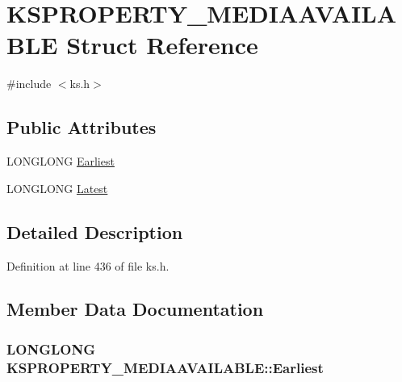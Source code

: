 \hypertarget{struct_k_s_p_r_o_p_e_r_t_y___m_e_d_i_a_a_v_a_i_l_a_b_l_e}{}\section{K\+S\+P\+R\+O\+P\+E\+R\+T\+Y\+\_\+\+M\+E\+D\+I\+A\+A\+V\+A\+I\+L\+A\+B\+LE Struct Reference}
\label{struct_k_s_p_r_o_p_e_r_t_y___m_e_d_i_a_a_v_a_i_l_a_b_l_e}


{\ttfamily \#include $<$ks.\+h$>$}

\subsection*{Public Attributes}
\begin{DoxyCompactItemize}
\item 
L\+O\+N\+G\+L\+O\+NG \hyperlink{struct_k_s_p_r_o_p_e_r_t_y___m_e_d_i_a_a_v_a_i_l_a_b_l_e_a0ff3eb2fb0a34ee47513d2aec844b30d}{Earliest}
\item 
L\+O\+N\+G\+L\+O\+NG \hyperlink{struct_k_s_p_r_o_p_e_r_t_y___m_e_d_i_a_a_v_a_i_l_a_b_l_e_a22df0452fc14201d10124a3eb59376d8}{Latest}
\end{DoxyCompactItemize}


\subsection{Detailed Description}


Definition at line 436 of file ks.\+h.



\subsection{Member Data Documentation}
\subsubsection[{\texorpdfstring{Earliest}{Earliest}}]{\setlength{\rightskip}{0pt plus 5cm}L\+O\+N\+G\+L\+O\+NG K\+S\+P\+R\+O\+P\+E\+R\+T\+Y\+\_\+\+M\+E\+D\+I\+A\+A\+V\+A\+I\+L\+A\+B\+L\+E\+::\+Earliest}\hypertarget{struct_k_s_p_r_o_p_e_r_t_y___m_e_d_i_a_a_v_a_i_l_a_b_l_e_a0ff3eb2fb0a34ee47513d2aec844b30d}{}\label{struct_k_s_p_r_o_p_e_r_t_y___m_e_d_i_a_a_v_a_i_l_a_b_l_e_a0ff3eb2fb0a34ee47513d2aec844b30d}


